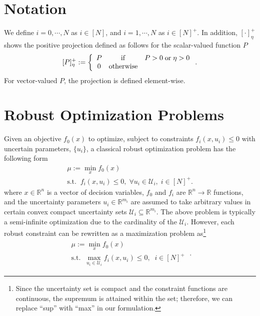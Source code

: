 \documentclass[journal,twoside,web]{ieeecolor}
\newcommand{\rev}[1]{\textcolor{revisionblue}{#1}}
\newcommand{\real}{\mathbb{R}}
\begin{document}
\section{Notation}\label{notations}

We define $i=0,\cdots,N$ as $i\in[N]$, and $i=1,\cdots,N$ as $i\in[N]^+$. In addition, $\left[\cdot\right]_\eta^+$ shows the positive projection defined as follows for the scalar-valued function $P$
\begin{align} \label{proj}
[P]_\eta^+:=\left\{\begin{array}{ccl}P&{\rm if}& P>0 \;{\rm or} \;\eta>0\\
0&{\rm otherwise}
\end{array}\right..
\end{align}
For vector-valued $P$, the projection is defined element-wise.

\section{Robust Optimization Problems}\label{sec_RO}
Given an objective $f_0(x)$ to optimize, subject to constraints $f_i(x,u_i) \leq 0$ with uncertain parameters, $\{u_i\}$, a classical robust optimization problem has the following form
$$
\begin{array}{l}
\mu:=\min_{x} f_0(x)\\
\text{s.t.}\;\;f_i(x,u_i)\leq 0,\; \forall u_i\in \mathcal{U}_i,\;i\in[N]^+.
\end{array}
$$
where $x\in \real^n$ is a vector of decision variables, $f_0$ and $f_i$ are $\real^n \to \real$ functions, and the uncertainty parameters $u_i \in \real^{m_i}$ are assumed to take arbitrary values in certain convex compact uncertainty sets $\mathcal{U}_i \subseteq \real^{m_i}$.
The above problem is typically a semi-infinite optimization due to the cardinality of the $\mathcal{U}_i$. However, each robust constraint can be rewritten as a maximization problem as\footnote{\rev{Since the uncertainty set is compact and the constraint functions are continuous, the supremum is attained within the set; therefore, we can replace ``sup'' with ``max'' in our formulation.}}
\begin{align}
\begin{array}{l}
\mu:=\min_{x} f_0(x)\\
\text{s.t.}\;\;\max_{u_i\in \mathcal{U}_i} f_i(x,u_i)\leq 0,\;\;i\in[N]^+
\end{array}\;.\label{standardRO}
\end{align}
\end{document}
